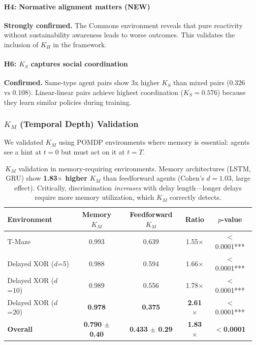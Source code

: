 \documentclass[11pt,a4paper]{article}
\newcommand{\km}{K_M}
\newcommand{\ks}{K_S}
\newcommand{\kh}{K_H}
\begin{document}
\paragraph{H4: Normative alignment matters (NEW)} \textbf{Strongly confirmed.} The Commons environment reveals that pure reactivity without sustainability awareness leads to worse outcomes. This validates the inclusion of $\kh$ in the framework.

\paragraph{H6: $\ks$ captures social coordination} \textbf{Confirmed.} Same-type agent pairs show 3x higher $\ks$ than mixed pairs (0.326 vs 0.108). Linear-linear pairs achieve highest coordination ($\ks = 0.576$) because they learn similar policies during training.

\subsubsection{$\km$ (Temporal Depth) Validation}

We validated $\km$ using POMDP environments where memory is essential: agents see a hint at $t=0$ but must act on it at $t=T$.

\begin{table}[h]
\centering
\begin{tabular}{lcccc}
\toprule
\textbf{Environment} & \textbf{Memory $\km$} & \textbf{Feedforward $\km$} & \textbf{Ratio} & \textbf{$p$-value} \\
\midrule
T-Maze & 0.993 & 0.639 & 1.55$\times$ & $<$0.0001*** \\
Delayed XOR ($d$=5) & 0.988 & 0.594 & 1.66$\times$ & $<$0.0001*** \\
Delayed XOR ($d$=10) & 0.989 & 0.556 & 1.78$\times$ & $<$0.0001*** \\
Delayed XOR ($d$=20) & \textbf{0.978} & \textbf{0.375} & \textbf{2.61$\times$} & $<$0.0001*** \\
\midrule
\textbf{Overall} & \textbf{0.790 $\pm$ 0.40} & \textbf{0.433 $\pm$ 0.29} & \textbf{1.83$\times$} & $<$\textbf{0.0001} \\
\bottomrule
\end{tabular}
\caption{$\km$ validation in memory-requiring environments. Memory architectures (LSTM, GRU) show \textbf{1.83$\times$ higher $\km$} than feedforward agents (Cohen's $d = 1.03$, large effect). Critically, discrimination \emph{increases} with delay length---longer delays require more memory utilization, which $\km$ correctly detects.}
\label{tab:km-validation}
\end{table}
\end{document}
